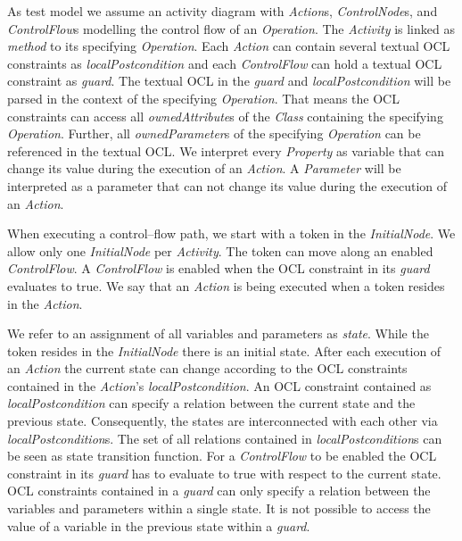 \documentclass[runningheads,a4paper]{llncs}%
\newcommand{\UMLType}[1]{\textsf{\textit{#1}}} %
\newcommand{\UMLReference}[1]{\textsf{\textit{#1}}} %
\begin{document}
As test model we assume an activity diagram with \UMLType{Action}s,
\UMLType{ControlNode}s, and \UMLType{ControlFlow}s modelling the control flow of
an \UMLType{Operation}. The \UMLType{Activity} is linked as
\UMLReference{method} to its specifying \UMLType{Operation}. Each
\UMLType{Action} can contain several textual OCL constraints as
\UMLReference{localPostcondition} and each \UMLType{ControlFlow} can hold a
textual OCL constraint as \UMLReference{guard}. The textual OCL in the
\UMLReference{guard} and \UMLReference{localPostcondition} will be parsed in the
context of the specifying \UMLType{Operation}. That means the OCL constraints
can access all \UMLReference{ownedAttribute}s of the \UMLType{Class} containing
the specifying \UMLType{Operation}. Further, all \UMLReference{ownedParameter}s
of the specifying \UMLType{Operation} can be referenced in the textual OCL. We
interpret every \UMLType{Property} as variable that can change its value during
the execution of an \UMLType{Action}. A \UMLType{Parameter} will be interpreted
as a parameter that can not change its value during the execution of an
\UMLType{Action}.

When executing a control--flow path, we start with a token in the
\UMLType{InitialNode}. We allow only one \UMLType{InitialNode} per
\UMLType{Activity}. The token can move along an enabled \UMLType{ControlFlow}. A
\UMLType{ControlFlow} is enabled when the OCL constraint in its
\UMLReference{guard} evaluates to true. We say that an \UMLType{Action} is being
executed when a token resides in the \UMLType{Action}.

We refer to an assignment of all variables and parameters as \emph{state}. While
the token resides in the \UMLType{InitialNode} there is an initial state. After
each execution of an \UMLType{Action} the current state can change according to
the OCL constraints contained in the \UMLType{Action}'s
\UMLReference{localPostcondition}. An OCL constraint contained as
\UMLType{localPostcondition} can specify a relation between the current state
and the previous state. Consequently, the states are interconnected with each
other via \UMLReference{localPostcondition}s. The set of all relations contained
in \UMLType{localPostcondition}s can be seen as state transition function. For a
\UMLType{ControlFlow} to be enabled the OCL constraint in its
\UMLReference{guard} has to evaluate to true with respect to the current state.
OCL constraints contained in a \UMLReference{guard} can only specify a relation
between the variables and parameters within a single state. It is not possible
to access the value of a variable in the previous state within a
\UMLReference{guard}.
%
\end{document}
